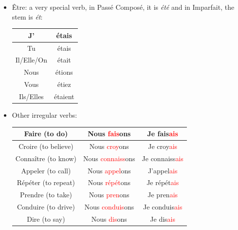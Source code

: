 \documentclass{book}
\begin{document}
\begin{itemize}
    \item Être: a very special verb, in Passé Composé, it is \textit{été} and in Imparfait, the stem is \textit{ét}:
    \begin{center}
        \begin{tabular}{|c|c|}
            \hline
            J' & étais \\
            \hline
            Tu & étais \\
            \hline
            Il/Elle/On & était \\
            \hline
            Nous & étions \\
            \hline
            Vous & étiez \\
            \hline
            Ils/Elles & étaient \\
            \hline
        \end{tabular}
    \end{center}
    
    \item Other irregular verbs:
    \begin{center}
        \begin{tabular}{|c|c|c|}
            \hline
            Faire (to do) & Nous \textcolor{red}{fais}ons & Je fais\textcolor{red}{ais} \\
            \hline
            Croire (to believe) & Nous \textcolor{red}{croy}ons & Je croy\textcolor{red}{ais} \\
            \hline
            Connaître (to know) & Nous \textcolor{red}{connaiss}ons & Je connaiss\textcolor{red}{ais} \\
            \hline
            Appeler (to call) & Nous \textcolor{red}{appel}ons & J'appel\textcolor{red}{ais} \\
            \hline
            Répéter (to repeat) & Nous \textcolor{red}{répét}ons & Je répét\textcolor{red}{ais} \\
            \hline
            Prendre (to take) & Nous \textcolor{red}{pren}ons & Je pren\textcolor{red}{ais} \\
            \hline
            Conduire (to drive) & Nous \textcolor{red}{conduis}ons & Je conduis\textcolor{red}{ais} \\
            \hline
            Dire (to say) & Nous \textcolor{red}{dis}ons & Je dis\textcolor{red}{ais} \\
            \hline
        \end{tabular}
    \end{center}
\end{itemize}
\end{document}
